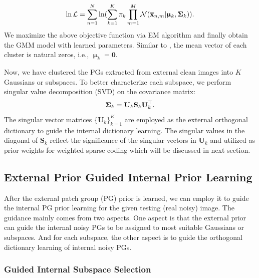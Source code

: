 \documentclass[10pt,twocolumn,letterpaper]{article}
\begin{document}
\vspace{-2mm}
\begin{equation}\label{equ2}\vspace{-2mm}
\begin{split}
\ln\mathcal{L}=\sum_{n=1}^{N} \ln(\sum_{k=1}^{K}\pi_{k}\prod_{m=1}^{M}\mathcal{N}(\mathbf{\overline{x}}_{n,m}|\boldsymbol{\upmu}_{k},\mathbf{\Sigma}_{k})).
\end{split}
\end{equation} 
We maximize the above objective function via EM algorithm \cite{em} and finally obtain the GMM model with learned parameters. Similar to \cite{pgpd}, the mean vector of each cluster is natural zeros, i.e., $\boldsymbol{\upmu}_{k}=\mathbf{0}$.

Now, we have clustered the PGs extracted from external clean images into $K$ Gaussians or subspaces. To better characterize each subspace, we perform singular value decomposition (SVD) on the covariance matrix:
\vspace{-2mm}
\begin{equation}\label{equ3}\vspace{-2mm}
\mathbf{\Sigma}_{k}=\mathbf{U}_{k}\mathbf{S}_{k}\mathbf{U}_{k}^{\top}.
\end{equation}
The singular vector matrices $\{\mathbf{U}_{k}\}_{k=1}^{K}$ are employed as the external orthogonal dictionary to guide the internal dictionary learning. The singular values in the diagonal of $\mathbf{S}_{k}$ reflect the significance of the singular vectors in $\mathbf{U}_{k}$ and utilized as prior weights for weighted sparse coding which will be discussed in next section.

\subsection{External Prior Guided Internal Prior Learning}

After the external patch group (PG) prior is learned, we can employ it to guide the internal PG prior learning for the given testing (real noisy) image. The guidance mainly comes from two aspects. One aspect is that the external prior can guide the internal noisy PGs to be assigned to most suitable Gaussians or subspaces. And for each subspace, the other aspect is to guide the orthogonal dictionary learning of internal noisy PGs.

\vspace{-2mm}
\subsubsection{Guided Internal Subspace Selection}
\vspace{-1mm}
\end{document}
